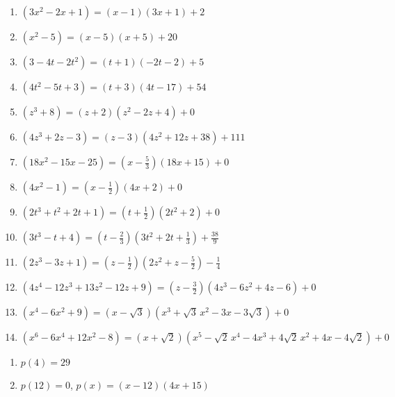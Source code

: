 \documentclass{ximera}
\begin{document}
\begin{enumerate}

\item $\left(3x^2-2x+1 \right) = \left(x-1\right) (3x+1)+2$
\item $\left(x^2-5 \right)= \left(x-5\right)(x+5) + 20$


\item $\left(3-4t-2t^2 \right) = \left(t+1\right)(-2t-2)+5$
\item $\left(4t^2-5t +3\right) = \left(t+3\right)(4t-17)+54$


\item $\left(z^3 + 8 \right) = \left(z+2\right) \left(z^2-2z+4\right) + 0$
\item $\left(4z^3 +2z-3 \right) = \left(z -3\right) \left(4z^2+12z+38\right) + 111$


\item $\left(18x^2-15x-25\right) = \left(x - \frac{5}{3} \right)(18x+15)+0$
\item $\left(4x^2-1 \right) = \left(x - \frac{1}{2} \right)(4x+2)+0$


\item $\left(2t^3+t^2+2t+1 \right) = \left(t + \frac{1}{2} \right)\left(2t^2+2\right)+0$
\item $\left(3t^3 - t + 4 \right) = \left(t - \frac{2}{3} \right) \left(3t^2+2t+\frac{1}{3}\right) + \frac{38}{9}$


\item $\left(2z^3 - 3z +1 \right) = \left(z - \frac{1}{2} \right) \left(2z^2+z-\frac{5}{2}\right)-\frac{1}{4}$
\item $\left(4z^4-12z^3+13z^2 -12z+9\right) = \left(z - \frac{3}{2} \right) \left(4z^3-6z^2+4z-6 \right)+0$

\item $\left(x^4-6x^2+9 \right) = \left(x -\sqrt{3} \right) \left(x^3+\sqrt{3} \,x^2-3x-3\sqrt{3}\right) + 0$
\item $\left(x^6-6x^4+12x^2-8\right) = \left(x +\sqrt{2} \right) \left(x^5-\sqrt{2} \, x^4-4x^3+4\sqrt{2} \, x^2+4x-4\sqrt{2}\right) + 0$


\setcounter{HW}{\value{enumi}}
\end{enumerate}

\begin{multicols}{2}
\begin{enumerate}
\setcounter{enumi}{\value{HW}}

\item $p(4) = 29$
\item $p(12) =0$, $p(x) = (x-12)(4x+15)$

\setcounter{HW}{\value{enumi}}
\end{enumerate}
\end{multicols}
\end{document}
